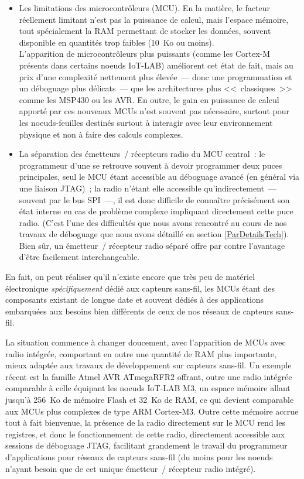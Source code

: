 \begin{itemize}

\item Les limitations des microcontrôleurs (MCU). En la matière, le facteur
réellement limitant n'est pas la puissance de calcul, mais l'espace mémoire,
tout spécialement la RAM permettant de stocker les données, souvent
disponible en quantités trop faibles (10~Ko ou moins).\\
L'apparition de microcontrôleurs plus puissants (comme les Cortex-M
présents dans certains noeuds IoT-LAB) améliorent cet état de fait, mais
au prix d'une complexité nettement plus élevée~--- donc une programmation
et un déboguage plus délicats~--- que les architectures plus <<~classiques~>>
comme les MSP430 ou les AVR. En outre, le gain en puissance de calcul
apporté par ces nouveaux MCUs n'est souvent pas nécessaire, surtout
pour les noeuds-feuilles destinés surtout à interagir avec leur
environnement physique et non à faire des calculs complexes.

\item La séparation des émetteurs~/ récepteurs radio du MCU central~:
le programmeur d'une  se retrouve souvent à devoir programmer
deux puces principales, seul le MCU étant accessible au déboguage avancé
(en général via une liaison JTAG)~; la radio n'étant elle accessible
qu'indirectement~--- souvent par le bus SPI~---, il est donc difficile
de connaître précisément son état interne en cas de problème complexe
impliquant directement cette puce radio. (C'est l'une des difficultés
que nous avons rencontré au cours de nos travaux de déboguage que nous
avons détaillé en section \vref{ParDetailsTech}). \\
Bien sûr, un émetteur~/ récepteur radio séparé offre par contre l'avantage
d'être facilement interchangeable.

\end{itemize}

\bigskip

En fait, on peut réaliser qu'il n'existe encore que très peu de matériel
électronique \emph{spécifiquement} dédié aux capteurs sans-fil, les MCUs
étant des composants existant de longue date et souvent dédiés à des
applications embarquées aux besoins bien différents de ceux de nos
réseaux de capteurs sans-fil.

La situation commence à changer doucement, avec l'apparition de MCUs avec
radio intégrée, comportant en outre une quantité de RAM plus importante,
mieux adaptée aux travaux de développement sur capteurs sans-fil.
Un exemple récent est la famille Atmel AVR ATmegaRFR2 \cite{DSATmegaRFR2}
offrant, outre une radio intégrée comparable à celle équipant les noeuds
IoT-LAB M3, un espace mémoire allant jusqu'à 256~Ko de mémoire Flash
et 32~Ko de RAM, ce qui devient comparable aux MCUs plus complexes de
type ARM Cortex-M3. Outre cette mémoire accrue tout à fait bienvenue,
la présence de la radio directement sur le MCU rend les registres, et
donc le fonctionnement de cette radio, directement accessible aux sessions
de déboguage JTAG, facilitant grandement le travail du programmeur
d'applications pour réseaux de capteurs sans-fil (du moins pour les
noeuds n'ayant besoin que de cet unique émetteur~/ récepteur radio
intégré).

